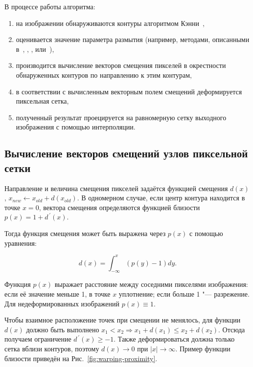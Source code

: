 В процессе работы алгоритма:
\begin{enumerate}[beginpenalty=10000]
	\item на изображении обнаруживаются контуры алгоритмом Кэнни~\cite{canny1986computational},
	\item оценивается значение параметра размытия (например, методами, описанными в~\cite{nasonov2015edge}, \cite{isprs-archives-XLII-2-W12-161-2019}, \cite{6583957}, \cite{7589980} или~\cite{Lee_2019_CVPR}),
	\item производится вычисление векторов смещения пикселей в окрестности обнаруженных контуров по направлению к этим контурам,
	\item в соответствии с вычисленным векторным полем смещений деформируется пиксельная сетка,
	\item полученный результат проецируется на равномерную сетку выходного изображения с помощью интерполяции.
\end{enumerate}

%

\subsection{Вычисление векторов смещений узлов пиксельной сетки}

Направление и величина смещения пикселей задаётся функцией смещения $d\left(x\right)$, $x_{new} \leftarrow x_{old}+d(x_{old})$. В одномерном случае, если центр контура находится в точке $x = 0$, вектора смещения определяются функцией близости $p\left(x\right)=1+d^{\,\prime}(x)$.

Тогда функция смещения может быть выражена через $p\left(x\right)$ с помощью уравнения:

\begin{equation*}
	d\left(x\right)=\int_{-\infty}^{x}\left(p\left(y\right)-1\right)dy.
\end{equation*}

Функция $p(x)$ выражает расстояние между соседними пикселями изображения: если её значение меньше 1, в точке $x$ уплотнение; если больше 1 "--- разрежение. Для недеформированных изображений $p(x)\equiv1$.

Чтобы взаимное расположение точек при смещении не менялось, для функции $d(x)$ должно быть выполнено $x_1<x_2 \Rightarrow x_1+d(x_1)\le x_2+d(x_2)$. Отсюда получаем ограничение $d^{\,\prime}\left(x\right)\geq-1$. Также деформироваться должна только сетка вблизи контуров, поэтому $d\left(x\right)\rightarrow0$ при  $\left|x\right|\rightarrow\infty$. Пример функции близости приведён на Рис.~\ref{fig:warping-proximity}.

